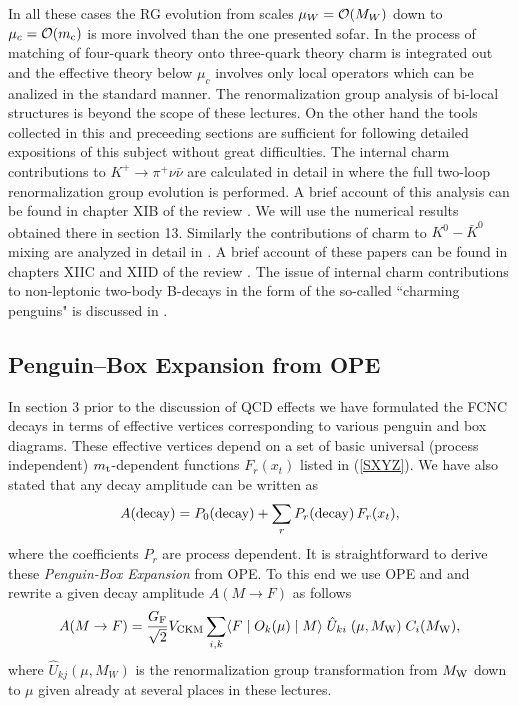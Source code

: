 \documentclass[12pt,rotate]{article}
\newcommand{\mt}{m_{\rm t}}
\newcommand{\mc}{m_{\rm c}}
\newcommand{\mw}{M_{\rm W}}
\newcommand{\ord}{{\cal O}}
\def\kpn{K^+\rightarrow\pi^+\nu\bar\nu}
\begin{document}
\begin{itemize}
\begin{itemize}
In all these cases the RG evolution from scales $\mu_W=\ord(M_W)$
down to $\mu_c=\ord(\mc)$ is more involved than the one presented
sofar. In the process of matching of four-quark theory onto
three-quark theory charm is integrated out and the effective theory
below $\mu_c$ involves only local operators which can be analized
in the standard manner. The renormalization group analysis of
bi-local structures is beyond the scope of these lectures.
On the other hand the tools collected in this and preceeding sections
are sufficient for following detailed expositions of this subject
without great difficulties. The internal charm contributions to
$\kpn$ are calculated in detail in \cite{BB3} where the full two-loop
renormalization group evolution is performed. A brief account of this
analysis can be found in chapter XIB of the review \cite{BBL}. We will use
the numerical results obtained there in section 13. Similarly
   the contributions of charm to $K^0-\bar K^0$ mixing are analyzed
in detail in \cite{HNa,HNb}. A brief account of these papers can be found
in chapters XIIC and XIID of the review \cite{BBL}.
The issue of internal charm contributions to non-leptonic two-body 
B-decays
in the form of the so-called ``charming penguins" 
is discussed in \cite{BF95,ITAL}.
\subsection{Penguin--Box Expansion from OPE}
In section 3 prior to the discussion of QCD effects we have formulated
the FCNC decays in terms of effective vertices corresponding to
various penguin and box diagrams. These effective vertices depend on
a set of basic universal (process independent) 
$\mt$-dependent functions $F_r(x_t)$ listed in 
(\ref{SXYZ}). We have also stated that any decay amplitude can be
written as
\begin{equation}
A({\rm decay}) = P_0({\rm decay}) + \sum_r P_r({\rm decay}) \, F_r(x_t),
\label{generalPBE1}
\end{equation}
where the coefficients $P_r$ are process dependent. It is
straightforward to derive these {\it Penguin-Box Expansion} \cite{PBE0}
from OPE.
To this end we use OPE and 
and rewrite a given decay amplitude $A(M\to F)$ as follows
\begin{equation}\label{USE}
A(M\to F)=\frac{G_{\rm F}}{\sqrt 2} V_{\rm CKM}
\sum_{i,k} \langle F\mid O_k(\mu)\mid M\rangle \;\hat U_{ki}\;(\mu,\mw) 
          \; C_i(\mw),
\end{equation}
where $\hat U_{kj}(\mu,M_W)$ is the renormalization group
transformation from $\mw$ down to $\mu$ given already at several
places in these lectures.


\end{itemize}
\end{itemize}
\end{document}
